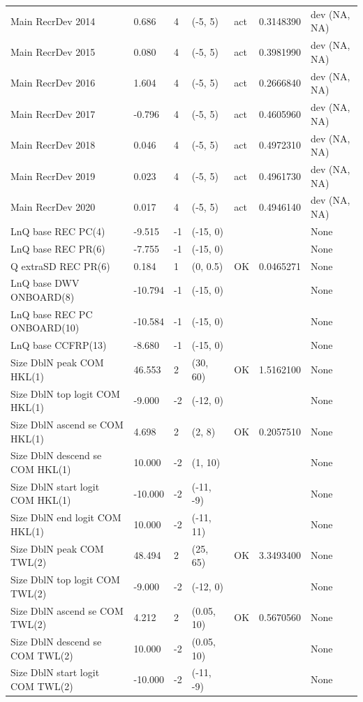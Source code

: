 \documentclass[11pt,
  english,
  a4paper,
]{article}
\begin{document}
\begin{landscape}
\begin{longtable}[t]{>{\raggedright\arraybackslash}p{8.5cm}lllll>{\raggedright\arraybackslash}p{4cm}}
Main RecrDev 2014 & 0.686 & 4 & (-5, 5) & act & 0.3148390 & dev (NA, NA)\\
Main RecrDev 2015 & 0.080 & 4 & (-5, 5) & act & 0.3981990 & dev (NA, NA)\\
Main RecrDev 2016 & 1.604 & 4 & (-5, 5) & act & 0.2666840 & dev (NA, NA)\\
Main RecrDev 2017 & -0.796 & 4 & (-5, 5) & act & 0.4605960 & dev (NA, NA)\\
Main RecrDev 2018 & 0.046 & 4 & (-5, 5) & act & 0.4972310 & dev (NA, NA)\\
Main RecrDev 2019 & 0.023 & 4 & (-5, 5) & act & 0.4961730 & dev (NA, NA)\\
Main RecrDev 2020 & 0.017 & 4 & (-5, 5) & act & 0.4946140 & dev (NA, NA)\\
LnQ base REC PC(4) & -9.515 & -1 & (-15, 0) &  &  & None\\
LnQ base REC PR(6) & -7.755 & -1 & (-15, 0) &  &  & None\\
Q extraSD REC PR(6) & 0.184 & 1 & (0, 0.5) & OK & 0.0465271 & None\\
LnQ base DWV ONBOARD(8) & -10.794 & -1 & (-15, 0) &  &  & None\\
LnQ base REC PC ONBOARD(10) & -10.584 & -1 & (-15, 0) &  &  & None\\
LnQ base CCFRP(13) & -8.680 & -1 & (-15, 0) &  &  & None\\
Size DblN peak COM HKL(1) & 46.553 & 2 & (30, 60) & OK & 1.5162100 & None\\
Size DblN top logit COM HKL(1) & -9.000 & -2 & (-12, 0) &  &  & None\\
Size DblN ascend se COM HKL(1) & 4.698 & 2 & (2, 8) & OK & 0.2057510 & None\\
Size DblN descend se COM HKL(1) & 10.000 & -2 & (1, 10) &  &  & None\\
Size DblN start logit COM HKL(1) & -10.000 & -2 & (-11, -9) &  &  & None\\
Size DblN end logit COM HKL(1) & 10.000 & -2 & (-11, 11) &  &  & None\\
Size DblN peak COM TWL(2) & 48.494 & 2 & (25, 65) & OK & 3.3493400 & None\\
Size DblN top logit COM TWL(2) & -9.000 & -2 & (-12, 0) &  &  & None\\
Size DblN ascend se COM TWL(2) & 4.212 & 2 & (0.05, 10) & OK & 0.5670560 & None\\
Size DblN descend se COM TWL(2) & 10.000 & -2 & (0.05, 10) &  &  & None\\
Size DblN start logit COM TWL(2) & -10.000 & -2 & (-11, -9) &  &  & None\\

\end{longtable}
\end{landscape}
\end{document}
